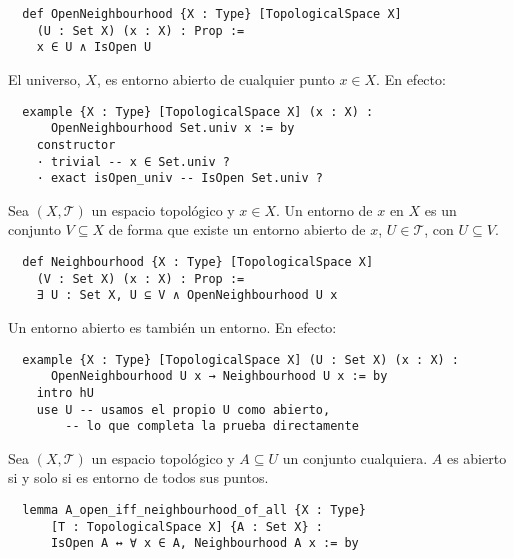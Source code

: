 \begin{lstlisting}
  def OpenNeighbourhood {X : Type} [TopologicalSpace X]
    (U : Set X) (x : X) : Prop :=
    x ∈ U ∧ IsOpen U
\end{lstlisting}

\begin{example}
  El universo, $X$, es entorno abierto de cualquier punto $x \in X$. En efecto:
\end{example}

\begin{lstlisting}
  example {X : Type} [TopologicalSpace X] (x : X) :
      OpenNeighbourhood Set.univ x := by
    constructor
    · trivial -- x ∈ Set.univ ?
    · exact isOpen_univ -- IsOpen Set.univ ? \end{lstlisting}

\begin{definition}
  Sea $(X, \mathcal{T})$ un espacio topológico y $x \in X$. Un \textnormal{entorno} de $x$ en $X$ es un conjunto $V \subseteq X$ de forma que existe un entorno abierto de $x$, $U \in \mathcal{T}$, con $U \subseteq V$.
\end{definition}

\begin{lstlisting}
  def Neighbourhood {X : Type} [TopologicalSpace X]
    (V : Set X) (x : X) : Prop :=
    ∃ U : Set X, U ⊆ V ∧ OpenNeighbourhood U x
\end{lstlisting}

\begin{example}
  Un entorno abierto es también un entorno. En efecto:
\end{example}

\begin{lstlisting}
  example {X : Type} [TopologicalSpace X] (U : Set X) (x : X) :
      OpenNeighbourhood U x → Neighbourhood U x := by
    intro hU
    use U -- usamos el propio U como abierto,
        -- lo que completa la prueba directamente
\end{lstlisting}

\begin{proposition}\label{caracterizacion-abierto}
  Sea $(X, \mathcal{T})$ un espacio topológico y $A \subseteq U$ un conjunto cualquiera. $A$ es abierto si y solo si es entorno de todos sus puntos.
\end{proposition}

\begin{lstlisting}
  lemma A_open_iff_neighbourhood_of_all {X : Type}
      [T : TopologicalSpace X] {A : Set X} :
      IsOpen A ↔ ∀ x ∈ A, Neighbourhood A x := by
\end{lstlisting}

